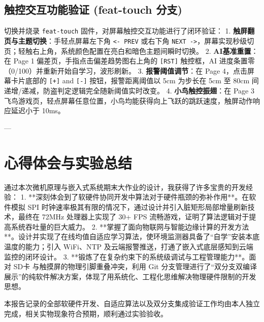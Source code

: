 \documentclass[11pt,a4paper]{ctexart}
\begin{document}
\subsection{触控交互功能验证 (feat-touch 分支)}
切换并烧录 \texttt{feat-touch} 固件，对屏幕触控交互功能进行了闭环验证：
1. \textbf{触屏翻页与主题切换}：手轻点屏幕左下角 \texttt{<- PREV} 或右下角 \texttt{NEXT ->}，屏幕实现秒级切页；轻触右上角，系统颜色配置在亮白和暗色主题间瞬时切换。
2. \textbf{AI基准重置}：在 Page 1 偏差页，手指点击偏差趋势图右上角的 \texttt{[RST]} 触控框，AI 进度条置零（0/100）并重新开始自学习，波形刷新。
3. \textbf{报警阈值调节}：在 Page 4，点击屏幕卡片底部的 \texttt{[+]} and \texttt{[-]} 按钮，报警距离阈值以 5cm 为步长在 5cm 至 80cm 间递增/递减，防盗判定逻辑完全随新阈值实时改变。
4. \textbf{小鸟触控振翅}：在 Page 3 飞鸟游戏页，轻点屏幕任意位置，小鸟均能获得向上飞跃的跳跃速度，触屏动作响应延迟小于 10ms。

---

\section{心得体会与实验总结}

通过本次微机原理与嵌入式系统期末大作业的设计，我获得了许多宝贵的开发经验：
1. **深刻体会到了软硬件协同开发中算法对于硬件瓶颈的弥补作用**。在软件模拟 SPI 时钟速率极其有限的情况下，通过设计并引入脏矩形局部增量刷新技术，最终在 72MHz 处理器上实现了 30+ FPS 流畅游戏，证明了算法逻辑对于提高系统吞吐量的巨大威力。
2. **掌握了面向物联网与智能边缘计算的开发方法**。设计并实现了在线均值自适应学习算法，使环境监测器具备了“自学”安装本底温度的能力；引入 WiFi、NTP 及云端报警推送，打通了嵌入式底层感知到云端监控的闭环设计。
3. **锻炼了在复杂约束下的系统级调试与工程管理能力**。面对 SD卡 与触摸屏的物理引脚重叠冲突，利用 Git 分支管理进行了“双分支双编译展示”的纯软件解决方案，体现了用系统化、工程化思维解决物理硬件限制的开发思想。

本报告记录的全部软硬件开发、自适应算法以及双分支集成验证工作均由本人独立完成，相关实物现象符合预期，顺利通过实验验收。
\end{document}
